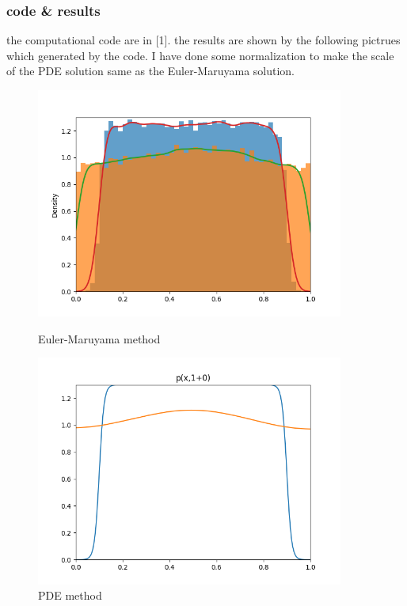 \documentclass{article}
\theoremstyle{definition} %
\begin{document}
\subsubsection{code \& results}
the computational code are in [1].
the results are shown by the following pictrues which
generated by the code.
I have done some normalization to make the scale of
the PDE solution same as the Euler-Maruyama solution.
\begin{figure}[ht!]
    \centering
    \begin{minipage}{0.45\textwidth}
        \centering
        \includegraphics[width=0.9\textwidth]{fig/distributioncombine.png} %
        \caption{Euler-Maruyama method}
        \label{fig:fig4}
    \end{minipage}\hfill
    \begin{minipage}{0.45\textwidth}
        \centering
        \includegraphics[width=0.9\textwidth]{fig/p(x,1+0).png} %
        \caption{PDE method}
    \end{minipage}
\end{figure}
\end{document}
